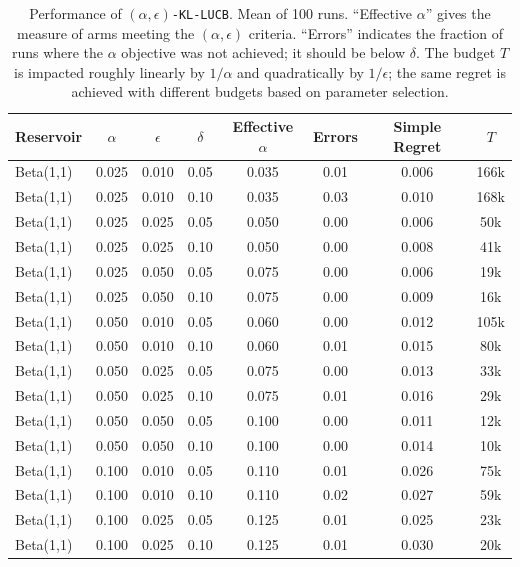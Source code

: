 \begin{table}
\caption{Performance of \texttt{$(\alpha,\epsilon)$-KL-LUCB}.
Mean of 100 runs.
``Effective $\alpha$'' gives the measure of arms meeting the $(\alpha,\epsilon)$
criteria.
``Errors'' indicates the fraction of runs where the $\alpha$
objective was not achieved; it should be below $\delta$.
The budget $T$ is impacted roughly linearly by $1/\alpha$ and quadratically 
by $1/\epsilon$; the same regret is achieved with different budgets based
on parameter selection.
}
\label{tbl-results-new}
\vskip 0.15in
\begin{center}
\begin{small}
\begin{sc}
\begin{tabular}{lccc|cccc}
\hline
Reservoir & $\alpha$ & $\epsilon$ & $\delta$ & Effective $\alpha$ & Errors & Simple Regret & $T$ \\
\hline
Beta(1,1) & 0.025 & 0.010 & 0.05 & 0.035 & 0.01 & 0.006 & 166k \\
Beta(1,1) & 0.025 & 0.010 & 0.10 & 0.035 & 0.03 & 0.010 & 168k \\
Beta(1,1) & 0.025 & 0.025 & 0.05 & 0.050 & 0.00 & 0.006 & 50k \\
Beta(1,1) & 0.025 & 0.025 & 0.10 & 0.050 & 0.00 & 0.008 & 41k \\
Beta(1,1) & 0.025 & 0.050 & 0.05 & 0.075 & 0.00 & 0.006 & 19k \\
Beta(1,1) & 0.025 & 0.050 & 0.10 & 0.075 & 0.00 & 0.009 & 16k \\
Beta(1,1) & 0.050 & 0.010 & 0.05 & 0.060 & 0.00 & 0.012 & 105k \\
Beta(1,1) & 0.050 & 0.010 & 0.10 & 0.060 & 0.01 & 0.015 & 80k \\
Beta(1,1) & 0.050 & 0.025 & 0.05 & 0.075 & 0.00 & 0.013 & 33k \\
Beta(1,1) & 0.050 & 0.025 & 0.10 & 0.075 & 0.01 & 0.016 & 29k \\
Beta(1,1) & 0.050 & 0.050 & 0.05 & 0.100 & 0.00 & 0.011 & 12k \\
Beta(1,1) & 0.050 & 0.050 & 0.10 & 0.100 & 0.00 & 0.014 & 10k \\
Beta(1,1) & 0.100 & 0.010 & 0.05 & 0.110 & 0.01 & 0.026 & 75k \\
Beta(1,1) & 0.100 & 0.010 & 0.10 & 0.110 & 0.02 & 0.027 & 59k \\
Beta(1,1) & 0.100 & 0.025 & 0.05 & 0.125 & 0.01 & 0.025 & 23k \\
Beta(1,1) & 0.100 & 0.025 & 0.10 & 0.125 & 0.01 & 0.030 & 20k \\

\end{tabular}
\end{sc}
\end{small}
\end{center}
\end{table}
